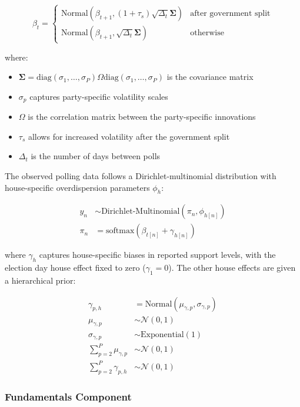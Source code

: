 \documentclass[
  letterpaper,
  DIV=11,
  numbers=noendperiod]{scrartcl}
\providecommand{\tightlist}{%
  \setlength{\itemsep}{0pt}\setlength{\parskip}{0pt}}\usepackage{longtable,booktabs,array}
\begin{document}
\[
\beta_{t} = \begin{cases}
\mathrm{Normal}\left(\beta_{t+1}, (1 + \tau_s)\sqrt{\Delta_t} \boldsymbol \Sigma\right) & \text{after government split} \\
\mathrm{Normal}\left(\beta_{t+1}, \sqrt{\Delta_t} \boldsymbol \Sigma\right) & \text{otherwise}
\end{cases}
\]

where:

\begin{itemize}
\tightlist
\item
  \(\boldsymbol \Sigma = \text{diag}(\sigma_1,\ldots,\sigma_P) \Omega \text{diag}(\sigma_1,\ldots,\sigma_P)\)
  is the covariance matrix
\item
  \(\sigma_p\) captures party-specific volatility scales
\item
  \(\Omega\) is the correlation matrix between the party-specific
  innovations
\item
  \(\tau_s\) allows for increased volatility after the government split
\item
  \(\Delta_t\) is the number of days between polls
\end{itemize}

The observed polling data follows a Dirichlet-multinomial distribution
with house-specific overdispersion parameters \(\phi_h\):

\[
\begin{aligned}
y_n &\sim \text{Dirichlet-Multinomial}(\pi_n, \phi_{h[n]}) \\
\pi_n &= \text{softmax}(\beta_{t[n]} + \gamma_{h[n]})
\end{aligned}
\]

where \(\gamma_{h}\) captures house-specific biases in reported support
levels, with the election day house effect fixed to zero
(\(\gamma_1 = 0\)). The other house effects are given a hierarchical
prior:

\[
\begin{aligned}
\gamma_{p,h} &= \mathrm{Normal}\left(\mu_{\gamma,p}, \sigma_{\gamma,p} \right)\\
\mu_{\gamma,p} &\sim \mathcal{N}(0, 1) \\
\sigma_{\gamma,p} &\sim \text{Exponential}(1) \\
\sum_{p=2}^{P} \mu_{\gamma,p} &\sim \mathcal{N}(0, 1) \\
\sum_{p=2}^{P} \gamma_{p, h} &\sim \mathcal{N}(0, 1)
\end{aligned}
\]

\subsubsection{Fundamentals Component}\label{fundamentals-component}
\end{document}
